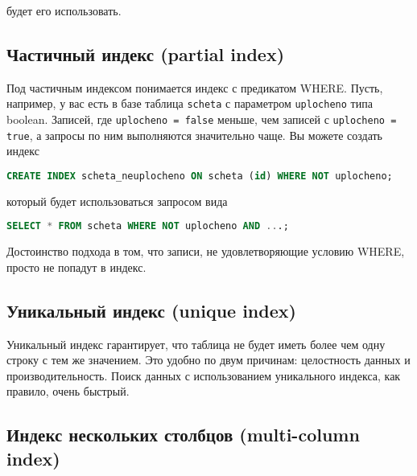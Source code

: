 будет его использовать.



\subsection{Частичный индекс (partial index)}

Под частичным индексом понимается индекс с предикатом WHERE. Пусть, например, у вас есть в базе таблица \lstinline!scheta! с параметром \lstinline!uplocheno! типа boolean. Записей, где \lstinline!uplocheno = false! меньше, чем записей с \lstinline!uplocheno = true!, а запросы по ним выполняются значительно чаще. Вы можете создать индекс

\begin{lstlisting}[language=SQL,label=lst:summary-indexes3,caption=Индекс]
CREATE INDEX scheta_neuplocheno ON scheta (id) WHERE NOT uplocheno;
\end{lstlisting}

который будет использоваться запросом вида

\begin{lstlisting}[language=SQL,label=lst:summary-indexes4,caption=Запрос]
SELECT * FROM scheta WHERE NOT uplocheno AND ...;
\end{lstlisting}

Достоинство подхода в том, что записи, не удовлетворяющие условию WHERE, просто не попадут в индекс.


\subsection{Уникальный индекс (unique index)}

Уникальный индекс гарантирует, что таблица не будет иметь более чем одну строку с тем же значением. Это удобно по двум причинам: целостность данных и производительность. Поиск данных с использованием уникального индекса, как правило, очень быстрый.


\subsection{Индекс нескольких столбцов (multi-column index)}

